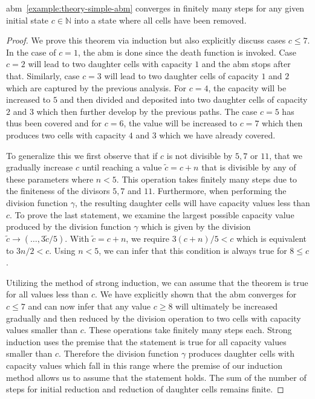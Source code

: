 \begin{proposition}
    \ac{abm}~\ref{example:theory-simple-abm} converges in finitely many steps for any given
    initial state $c\in\mathbb{N}$ into a state where all cells have been removed.
    \label{proposition:theory-simple-abm-converges}
\end{proposition}

\begin{proof}
    We prove this theorem via induction but also explicitly discuss cases $c\leq7$.
    In the case of $c=1$, the \ac{abm} is done since the death function is invoked.
    Case $c=2$ will lead to two daughter cells with capacity $1$ and the \ac{abm} stops after
    that.
    Similarly, case $c=3$ will lead to two daughter cells of capacity $1$ and $2$ which are
    captured by the previous analysis.
    For $c=4$, the capacity will be increased to $5$ and then divided and deposited into two
    daughter cells of capacity $2$ and $3$ which then further develop by the previous paths.
    The case $c=5$ has thus been covered and for $c=6$, the value will be increased to $c=7$ which
    then produces two cells with capacity $4$ and $3$ which we have already covered.

    To generalize this we first observe that if $c$ is not divisible by $5,7$ or $11$, that we
    gradually increase $c$ until reaching a value $\tilde{c}=c+n$ that is divisible by any of these
    parameters where $n<5$.
    This operation takes finitely many steps due to the finiteness of the divisors $5,7$ and $11$.
    Furthermore, when performing the division function $\gamma$, the resulting daughter cells will
    have capacity values less than $c$.
    To prove the last statement, we examine the largest possible capacity value produced by the
    division function $\gamma$ which is given by the division
    $\tilde{c}\rightarrow(\dots,3\tilde{c}/5)$.
    With $\tilde{c}=c+n$, we require $3(c+n)/5 < c$ which is equivalent to $3n/2 < c$.
    Using $n<5$, we can infer that this condition is always true for $8\leq c$.

    Utilizing the method of strong induction, we can assume that the theorem is true for all
    values less than $c$.
    We have explicitly shown that the \ac{abm} converges for $c\leq7$ and can now infer that
    any value $c\geq8$ will ultimately be increased gradually and then reduced by the division
    operation to two cells with capacity values smaller than $c$.
    These operations take finitely many steps each.
    Strong induction uses the premise that the statement is true for all capacity values smaller
    than $c$.
    Therefore the division function $\gamma$ produces daughter cells with capacity values which fall
    in this range where the premise of our induction method allows us to assume that the statement
    holds.
    The sum of the number of steps for initial reduction and reduction of daughter cells remains
    finite.
\end{proof}

